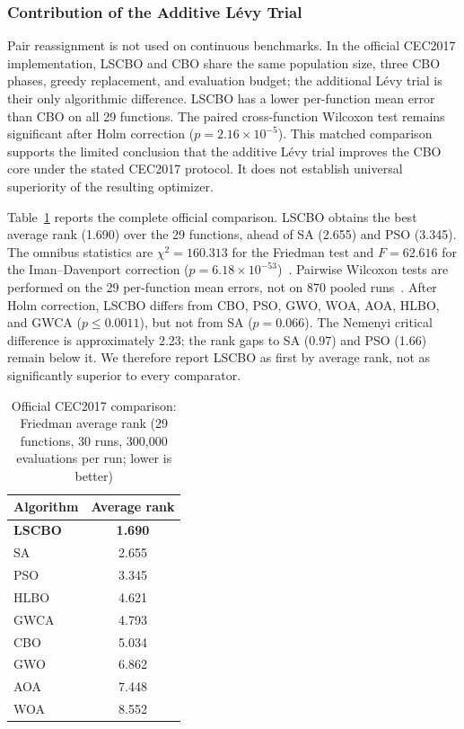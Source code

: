 \documentclass[pdflatex,onecolumn,sn-mathphys-num]{sn-jnl}
\begin{document}
\subsubsection{Contribution of the Additive L\'{e}vy Trial}\label{sec:cec_levy_ablation}
Pair reassignment is not used on continuous benchmarks. In the official CEC2017 implementation, LSCBO and CBO share the same population size, three CBO phases, greedy replacement, and evaluation budget; the additional L\'{e}vy trial is their only algorithmic difference. LSCBO has a lower per-function mean error than CBO on all 29 functions. The paired cross-function Wilcoxon test remains significant after Holm correction ($p=2.16\times10^{-5}$). This matched comparison supports the limited conclusion that the additive L\'{e}vy trial improves the CBO core under the stated CEC2017 protocol. It does not establish universal superiority of the resulting optimizer.

Table~\ref{tab:cec_external} reports the complete official comparison. LSCBO obtains the best average rank (1.690) over the 29 functions, ahead of SA (2.655) and PSO (3.345). The omnibus statistics are $\chi^2=160.313$ for the Friedman test and $F=62.616$ for the Iman--Davenport correction ($p=6.18\times10^{-53}$)~\cite{Friedman1937,ImanDavenport1980}. Pairwise Wilcoxon tests are performed on the 29 per-function mean errors, not on 870 pooled runs~\cite{Wilcoxon1945}. After Holm correction, LSCBO differs from CBO, PSO, GWO, WOA, AOA, HLBO, and GWCA ($p\leq0.0011$), but not from SA ($p=0.066$). The Nemenyi critical difference is approximately 2.23; the rank gaps to SA (0.97) and PSO (1.66) remain below it. We therefore report LSCBO as first by average rank, not as significantly superior to every comparator.

\begin{table}[ht]
\centering
\caption{Official CEC2017 comparison: Friedman average rank (29 functions, 30 runs, 300,000 evaluations per run; lower is better)}\label{tab:cec_external}
\begin{tabular}{l c}
\toprule
\textbf{Algorithm} & \textbf{Average rank} \\
\midrule
\textbf{LSCBO} & \textbf{1.690} \\
SA             & 2.655 \\
PSO            & 3.345 \\
HLBO           & 4.621 \\
GWCA           & 4.793 \\
CBO            & 5.034 \\
GWO            & 6.862 \\
AOA            & 7.448 \\
WOA            & 8.552 \\
\bottomrule
\end{tabular}
\end{table}
\end{document}

